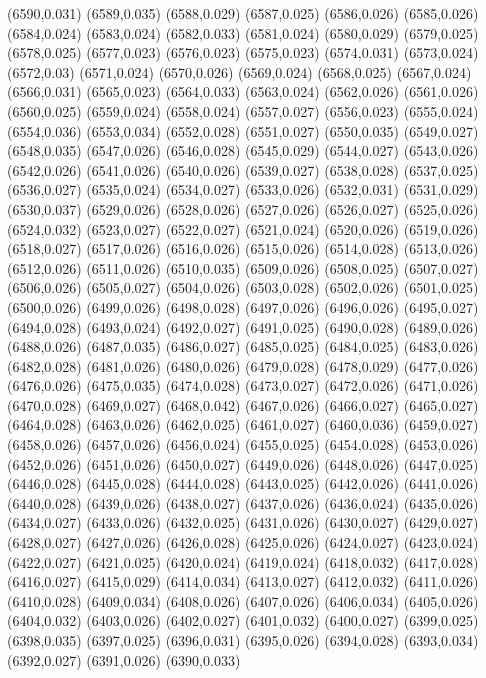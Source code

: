 (6590,0.031)
(6589,0.035)
(6588,0.029)
(6587,0.025)
(6586,0.026)
(6585,0.026)
(6584,0.024)
(6583,0.024)
(6582,0.033)
(6581,0.024)
(6580,0.029)
(6579,0.025)
(6578,0.025)
(6577,0.023)
(6576,0.023)
(6575,0.023)
(6574,0.031)
(6573,0.024)
(6572,0.03)
(6571,0.024)
(6570,0.026)
(6569,0.024)
(6568,0.025)
(6567,0.024)
(6566,0.031)
(6565,0.023)
(6564,0.033)
(6563,0.024)
(6562,0.026)
(6561,0.026)
(6560,0.025)
(6559,0.024)
(6558,0.024)
(6557,0.027)
(6556,0.023)
(6555,0.024)
(6554,0.036)
(6553,0.034)
(6552,0.028)
(6551,0.027)
(6550,0.035)
(6549,0.027)
(6548,0.035)
(6547,0.026)
(6546,0.028)
(6545,0.029)
(6544,0.027)
(6543,0.026)
(6542,0.026)
(6541,0.026)
(6540,0.026)
(6539,0.027)
(6538,0.028)
(6537,0.025)
(6536,0.027)
(6535,0.024)
(6534,0.027)
(6533,0.026)
(6532,0.031)
(6531,0.029)
(6530,0.037)
(6529,0.026)
(6528,0.026)
(6527,0.026)
(6526,0.027)
(6525,0.026)
(6524,0.032)
(6523,0.027)
(6522,0.027)
(6521,0.024)
(6520,0.026)
(6519,0.026)
(6518,0.027)
(6517,0.026)
(6516,0.026)
(6515,0.026)
(6514,0.028)
(6513,0.026)
(6512,0.026)
(6511,0.026)
(6510,0.035)
(6509,0.026)
(6508,0.025)
(6507,0.027)
(6506,0.026)
(6505,0.027)
(6504,0.026)
(6503,0.028)
(6502,0.026)
(6501,0.025)
(6500,0.026)
(6499,0.026)
(6498,0.028)
(6497,0.026)
(6496,0.026)
(6495,0.027)
(6494,0.028)
(6493,0.024)
(6492,0.027)
(6491,0.025)
(6490,0.028)
(6489,0.026)
(6488,0.026)
(6487,0.035)
(6486,0.027)
(6485,0.025)
(6484,0.025)
(6483,0.026)
(6482,0.028)
(6481,0.026)
(6480,0.026)
(6479,0.028)
(6478,0.029)
(6477,0.026)
(6476,0.026)
(6475,0.035)
(6474,0.028)
(6473,0.027)
(6472,0.026)
(6471,0.026)
(6470,0.028)
(6469,0.027)
(6468,0.042)
(6467,0.026)
(6466,0.027)
(6465,0.027)
(6464,0.028)
(6463,0.026)
(6462,0.025)
(6461,0.027)
(6460,0.036)
(6459,0.027)
(6458,0.026)
(6457,0.026)
(6456,0.024)
(6455,0.025)
(6454,0.028)
(6453,0.026)
(6452,0.026)
(6451,0.026)
(6450,0.027)
(6449,0.026)
(6448,0.026)
(6447,0.025)
(6446,0.028)
(6445,0.028)
(6444,0.028)
(6443,0.025)
(6442,0.026)
(6441,0.026)
(6440,0.028)
(6439,0.026)
(6438,0.027)
(6437,0.026)
(6436,0.024)
(6435,0.026)
(6434,0.027)
(6433,0.026)
(6432,0.025)
(6431,0.026)
(6430,0.027)
(6429,0.027)
(6428,0.027)
(6427,0.026)
(6426,0.028)
(6425,0.026)
(6424,0.027)
(6423,0.024)
(6422,0.027)
(6421,0.025)
(6420,0.024)
(6419,0.024)
(6418,0.032)
(6417,0.028)
(6416,0.027)
(6415,0.029)
(6414,0.034)
(6413,0.027)
(6412,0.032)
(6411,0.026)
(6410,0.028)
(6409,0.034)
(6408,0.026)
(6407,0.026)
(6406,0.034)
(6405,0.026)
(6404,0.032)
(6403,0.026)
(6402,0.027)
(6401,0.032)
(6400,0.027)
(6399,0.025)
(6398,0.035)
(6397,0.025)
(6396,0.031)
(6395,0.026)
(6394,0.028)
(6393,0.034)
(6392,0.027)
(6391,0.026)
(6390,0.033)
